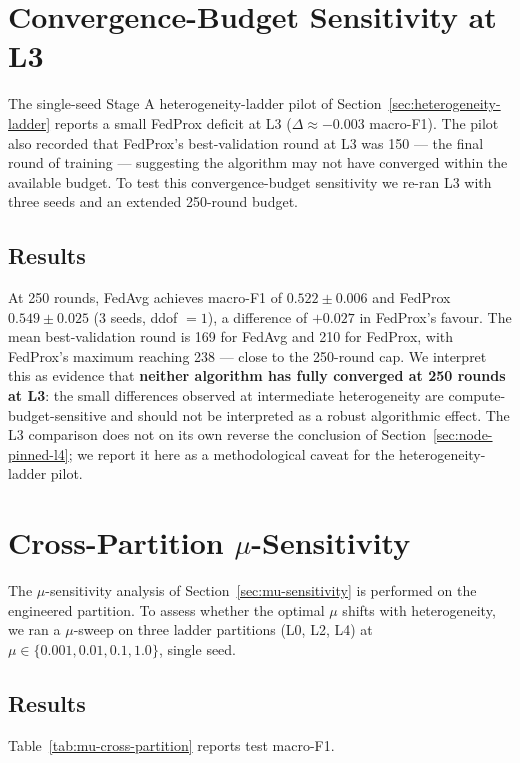 \documentclass[11pt,a4paper]{report}
\begin{document}

\section{Convergence-Budget Sensitivity at L3}
\label{sec:extended-rounds-l3}

The single-seed Stage A heterogeneity-ladder pilot of
Section~\ref{sec:heterogeneity-ladder} reports a small FedProx
deficit at L3 ($\Delta \approx -0.003$ macro-F1). The pilot also
recorded that FedProx's best-validation round at L3 was 150 --- the
final round of training --- suggesting the algorithm may not have
converged within the available budget. To test this convergence-budget
sensitivity we re-ran L3 with three seeds and an extended 250-round
budget.

\subsection{Results}
At 250 rounds, FedAvg achieves macro-F1 of $0.522 \pm 0.006$ and
FedProx $0.549 \pm 0.025$ (3 seeds, ddof $= 1$), a difference of
$+0.027$ in FedProx's favour. The mean best-validation round is
169 for FedAvg and 210 for FedProx, with FedProx's maximum reaching
238 --- close to the 250-round cap. We interpret this as evidence
that \textbf{neither algorithm has fully converged at 250 rounds at
L3}: the small differences observed at intermediate heterogeneity
are compute-budget-sensitive and should not be interpreted as a
robust algorithmic effect. The L3 comparison does not on its own
reverse the conclusion of Section~\ref{sec:node-pinned-l4}; we report
it here as a methodological caveat for the heterogeneity-ladder pilot.


\section{Cross-Partition $\mu$-Sensitivity}
\label{sec:mu-cross-partition}

The $\mu$-sensitivity analysis of Section~\ref{sec:mu-sensitivity}
is performed on the engineered partition. To assess whether the
optimal $\mu$ shifts with heterogeneity, we ran a $\mu$-sweep on
three ladder partitions (L0, L2, L4) at $\mu \in \{0.001, 0.01,
0.1, 1.0\}$, single seed.

\subsection{Results}
Table~\ref{tab:mu-cross-partition} reports test macro-F1.
\end{document}
